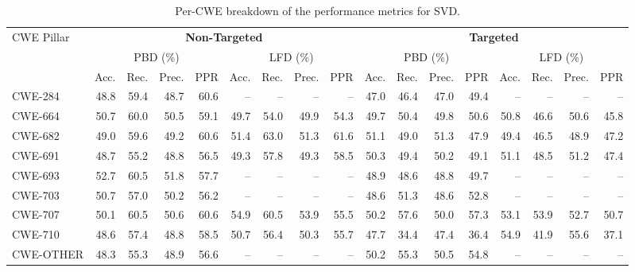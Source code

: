 \documentclass[lettersize,journal]{IEEEtran}
\begin{document}
\begin{table}[!t]
    \centering%
    \caption{Per-CWE breakdown of the performance metrics for \gls{SVD}.}
    \label{tab:cwe-metrics-svd}
    \scriptsize
    \renewcommand{\arraystretch}{1.0}
    \begin{tabular}{l rr rr rr rr rr rr rr rr}
    \toprule
    \multirow{3}{*}{CWE Pillar}
      & \multicolumn{8}{c}{\textbf{Non-Targeted}}
      & \multicolumn{8}{c}{\textbf{Targeted}} \\
    \cmidrule(lr){2-9} \cmidrule(lr){10-17}
      & \multicolumn{4}{c}{PBD (\%)} & \multicolumn{4}{c}{LFD (\%)}
      & \multicolumn{4}{c}{PBD (\%)} & \multicolumn{4}{c}{LFD (\%)} \\
    \cmidrule(lr){2-5} \cmidrule(lr){6-9} \cmidrule(lr){10-13} \cmidrule(lr){14-17}
      & Acc. & Rec. & Prec. & PPR 
      & Acc. & Rec. & Prec. & PPR 
      & Acc. & Rec. & Prec. & PPR 
      & Acc. & Rec. & Prec. & PPR \\
    \midrule
    CWE-284 & 48.8 & 59.4 & 48.7 & 60.6 & -- & -- & -- & -- & 47.0 & 46.4 & 47.0 & 49.4 & -- & -- & -- & -- \\
    CWE-664 & 50.7 & 60.0 & 50.5 & 59.1 & 49.7 & 54.0 & 49.9 & 54.3 & 49.7 & 50.4 & 49.8 & 50.6 & 50.8 & 46.6 & 50.6 & 45.8 \\
    CWE-682 & 49.0 & 59.6 & 49.2 & 60.6 & 51.4 & 63.0 & 51.3 & 61.6 & 51.1 & 49.0 & 51.3 & 47.9 & 49.4 & 46.5 & 48.9 & 47.2 \\
    CWE-691 & 48.7 & 55.2 & 48.8 & 56.5 & 49.3 & 57.8 & 49.3 & 58.5 & 50.3 & 49.4 & 50.2 & 49.1 & 51.1 & 48.5 & 51.2 & 47.4 \\
    CWE-693 & 52.7 & 60.5 & 51.8 & 57.7 & -- & -- & -- & -- & 48.9 & 48.6 & 48.8 & 49.7 & -- & -- & -- & -- \\
    CWE-703 & 50.7 & 57.0 & 50.2 & 56.2 & -- & -- & -- & -- & 48.6 & 51.3 & 48.6 & 52.8 & -- & -- & -- & -- \\
    CWE-707 & 50.1 & 60.5 & 50.6 & 60.6 & 54.9 & 60.5 & 53.9 & 55.5 & 50.2 & 57.6 & 50.0 & 57.3 & 53.1 & 53.9 & 52.7 & 50.7 \\
    CWE-710 & 48.6 & 57.4 & 48.8 & 58.5 & 50.7 & 56.4 & 50.3 & 55.7 & 47.7 & 34.4 & 47.4 & 36.4 & 54.9 & 41.9 & 55.6 & 37.1 \\
    CWE-OTHER & 48.3 & 55.3 & 48.9 & 56.6 & -- & -- & -- & -- & 50.2 & 55.3 & 50.5 & 54.8 & -- & -- & -- & -- \\
    \bottomrule
    \end{tabular}
\end{table}
\end{document}
